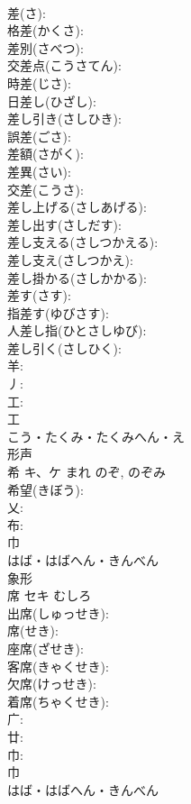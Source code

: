 \documentclass[8pt]{extreport}
\begin{document}
\begin{CJK}{UTF8}{min}
\\	差(さ): 
\\	格差(かくさ): 
\\	差別(さべつ): 
\\	交差点(こうさてん): 
\\	時差(じさ): 
\\	日差し(ひざし): 
\\	差し引き(さしひき): 
\\	誤差(ごさ): 
\\	差額(さがく): 
\\	差異(さい): 
\\	交差(こうさ): 
\\	差し上げる(さしあげる): 
\\	差し出す(さしだす): 
\\	差し支える(さしつかえる): 
\\	差し支え(さしつかえ): 
\\	差し掛かる(さしかかる): 
\\	差す(さす): 
\\	指差す(ゆびさす): 
\\	人差し指(ひとさしゆび): 
\\	差し引く(さしひく): 
\\	羊: 
\\	丿: 
\\	工: 
\\	工	
\\	こう・たくみ・たくみへん・え	
\\	形声 
\\	希	キ、ケ	まれ	のぞ, のぞみ	
\\	希望(きぼう): 
\\	乂: 
\\	布: 
\\	巾	
\\	はば・はばへん・きんべん	
\\	象形 
\\	席	セキ	むしろ		
\\	出席(しゅっせき): 
\\	席(せき): 
\\	座席(ざせき): 
\\	客席(きゃくせき): 
\\	欠席(けっせき): 
\\	着席(ちゃくせき): 
\\	广: 
\\	廿: 
\\	巾: 
\\	巾	
\\	はば・はばへん・きんべん	

\end{CJK}
\end{document}
